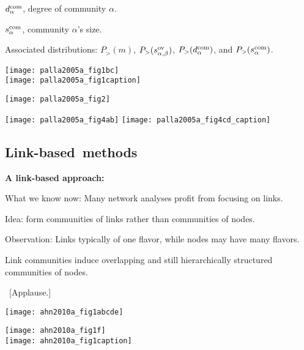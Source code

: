         $d_{\alpha}^{\textnormal{com}}$, degree of community $\alpha$.
      
        $s_{\alpha}^{\textnormal{com}}$, community $\alpha$'s size.
      
    
      Associated distributions:\newline
      $P_{>}(m)$,
      $P_{>}(s_{\alpha,\beta}^{\textnormal{ov}})$,
      $P_{>}(d_{\alpha}^{\textnormal{com}})$,
      and
      $P_{>}(s_{\alpha}^{\textnormal{com}})$.
    
  



  \begin{center}
  \texttt{[image: palla2005a\_fig1bc]}\\
  \texttt{[image: palla2005a\_fig1caption]}
  \end{center}

  \begin{center}
  \texttt{[image: palla2005a\_fig2]}
  \end{center}

  \texttt{[image: palla2005a\_fig4ab]}
  \texttt{[image: palla2005a\_fig4cd\_caption]}

\subsection{Link-based\ methods}


  \textbf{A link-based approach:}
    
     
      What we know now: Many network analyses profit from focusing on links.
     
      Idea: form communities of links rather than communities
      of nodes.
     
      Observation: Links typically of one flavor, while
      nodes may have many flavors.
     
      Link communities induce overlapping and
      still hierarchically structured communities of nodes.
     
      \ [Applause.]
    
  



      
    \texttt{[image: ahn2010a\_fig1abcde]}
    
    \texttt{[image: ahn2010a\_fig1f]}\\
    \texttt{[image: ahn2010a\_fig1caption]}
  
